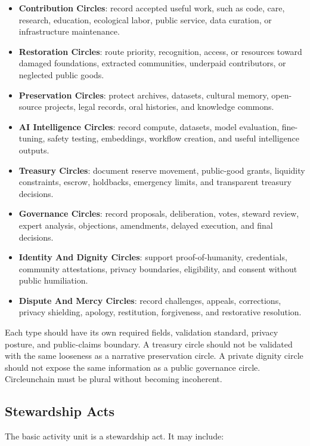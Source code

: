 \documentclass[12pt]{article}
\begin{document}
\begin{itemize}
  \item \textbf{Contribution Circles}: record accepted useful work, such as code, care, research, education, ecological labor, public service, data curation, or infrastructure maintenance.
  \item \textbf{Restoration Circles}: route priority, recognition, access, or resources toward damaged foundations, extracted communities, underpaid contributors, or neglected public goods.
  \item \textbf{Preservation Circles}: protect archives, datasets, cultural memory, open-source projects, legal records, oral histories, and knowledge commons.
  \item \textbf{AI Intelligence Circles}: record compute, datasets, model evaluation, fine-tuning, safety testing, embeddings, workflow creation, and useful intelligence outputs.
  \item \textbf{Treasury Circles}: document reserve movement, public-good grants, liquidity constraints, escrow, holdbacks, emergency limits, and transparent treasury decisions.
  \item \textbf{Governance Circles}: record proposals, deliberation, votes, steward review, expert analysis, objections, amendments, delayed execution, and final decisions.
  \item \textbf{Identity And Dignity Circles}: support proof-of-humanity, credentials, community attestations, privacy boundaries, eligibility, and consent without public humiliation.
  \item \textbf{Dispute And Mercy Circles}: record challenges, appeals, corrections, privacy shielding, apology, restitution, forgiveness, and restorative resolution.
\end{itemize}

Each type should have its own required fields, validation standard, privacy posture, and public-claims boundary. A treasury circle should not be validated with the same looseness as a narrative preservation circle. A private dignity circle should not expose the same information as a public governance circle. Circleunchain must be plural without becoming incoherent.

\subsection{Stewardship Acts}

The basic activity unit is a stewardship act. It may include:
\end{document}
